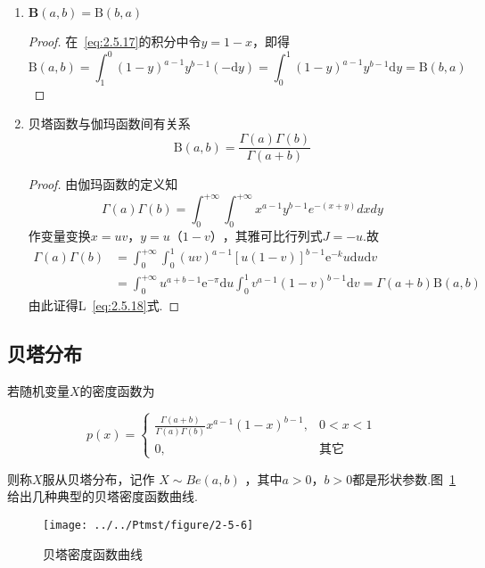 \begin{enumerate}
	\item $\mathbf{B}(a, b)=\mathrm{B}(b, a)$
	\begin{proof}
		在~\ref{eq:2.5.17}的积分中令$ y=1-x $，即得
		\[
		\mathrm{B}(a, b)=\int_{1}^{0}(1-y)^{a-1} y^{b-1}(-\mathrm{d} y)=\int_{0}^{1}(1-y)^{a-1} y^{b-1} \mathrm{d} y=\mathrm{B}(b, a)
		\]
	\end{proof}
	\item 贝塔函数与伽玛函数间有关系
	\begin{equation}
	\mathrm{B}(a, b)=\frac{\Gamma(a) \Gamma(b)}{\Gamma(a+b)} \label{eq:2.5.18}
	\end{equation}
	\begin{proof}
		由伽玛函数的定义知
		\[
		\Gamma(a) \Gamma(b)=\int_{0}^{+\infty} \int_{0}^{+\infty} x^{a-1} y^{b-1} e^{-(x+y)} d x d y
		\]
		作变量变换$ x=uv $，$ y=u（1-v） $，其雅可比行列式$ J=-u $.故
		\[
		\begin{aligned} \Gamma(a) \Gamma(b) &=\int_{0}^{+\infty} \int_{0}^{1}(u v)^{a-1}[u(1-v)]^{b-1} \mathrm{e}^{-k} u \mathrm{d} u \mathrm{d} v \\ &=\int_{0}^{+\infty} u^{a+b-1} \mathrm{e}^{-\pi} \mathrm{d} u \int_{0}^{1} v^{a-1}(1-v)^{b-1} \mathrm{d} v=\Gamma(a+b) \mathrm{B}(a, b) \end{aligned}
		\]
		由此证得L~\ref{eq:2.5.18}式.
	\end{proof}
\end{enumerate}

\subsection{贝塔分布}

若随机变量$ X $的密度函数为

\begin{equation}
p(x)=\left\{\begin{array}{ll}
{\frac{\Gamma(a+b)}{\Gamma(a) \Gamma(b)} x^{a-1}(1-x)^{b-1},} & { 0<x<1}\\ 
{0,} & {\text{其它}}
\end{array}
\right. \label{eq:2.5.19}
\end{equation}

则称$ X $服从贝塔分布，记作 $X \sim B e(a, b)$ ，其中$ a>0，b>0 $都是形状参数.图~\ref{fig:2-5-6}给出几种典型的贝塔密度函数曲线.

\begin{figure}
	\centering
	\texttt{[image: ../../Ptmst/figure/2-5-6]}
	\caption{贝塔密度函数曲线}
	\label{fig:2-5-6}
\end{figure}

